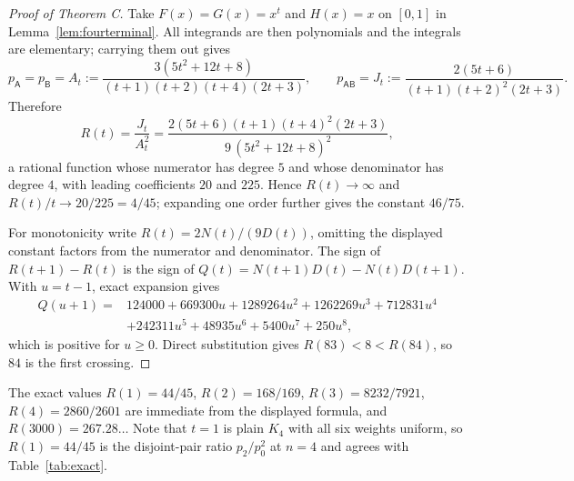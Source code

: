 \documentclass[11pt,a4paper]{amsart}
\theoremstyle{plain}
\theoremstyle{definition}
\theoremstyle{remark}
\begin{document}
\begin{proof}[Proof of Theorem C]
Take $F(x)=G(x)=x^t$ and $H(x)=x$ on $[0,1]$ in Lemma~\ref{lem:fourterminal}.
All integrands are then polynomials and the integrals are elementary; carrying
them out gives
\begin{equation}
\label{eq:AtJt}
p_{\mathsf A}=p_{\mathsf B}=A_t:=\frac{3(5t^2+12t+8)}{(t+1)(t+2)(t+4)(2t+3)},
\qquad
p_{\mathsf{AB}}=J_t:=\frac{2(5t+6)}{(t+1)(t+2)^2(2t+3)} .
\end{equation}
Therefore
\[
R(t)=\frac{J_t}{A_t^2}
=\frac{2(5t+6)(t+1)(t+4)^2(2t+3)}{9\,(5t^2+12t+8)^2},
\]
a rational function whose numerator has degree $5$ and whose denominator has
degree $4$, with leading coefficients $20$ and $225$. Hence $R(t)\to\infty$ and
$R(t)/t\to20/225=4/45$; expanding one order further gives the constant $46/75$.

For monotonicity write $R(t)=2N(t)/(9D(t))$, omitting the displayed constant
factors from the numerator and denominator. The sign of $R(t+1)-R(t)$ is the
sign of $Q(t)=N(t+1)D(t)-N(t)D(t+1)$. With $u=t-1$, exact expansion gives
\begin{align*}
Q(u+1)={}&124000+669300u+1289264u^2+1262269u^3+712831u^4\\
&+242311u^5+48935u^6+5400u^7+250u^8,
\end{align*}
which is positive for $u\ge0$. Direct substitution gives $R(83)<8<R(84)$,
so $84$ is the first crossing.
\end{proof}

The exact values $R(1)=44/45$, $R(2)=168/169$, $R(3)=8232/7921$,
$R(4)=2860/2601$ are immediate from the displayed formula, and
$R(3000)=267.28\ldots$ Note
that $t=1$ is plain $K_4$ with all six weights uniform, so $R(1)=44/45$ is the
disjoint-pair ratio $p_2/p_0^2$ at $n=4$ and agrees with Table~\ref{tab:exact}.
\end{document}

